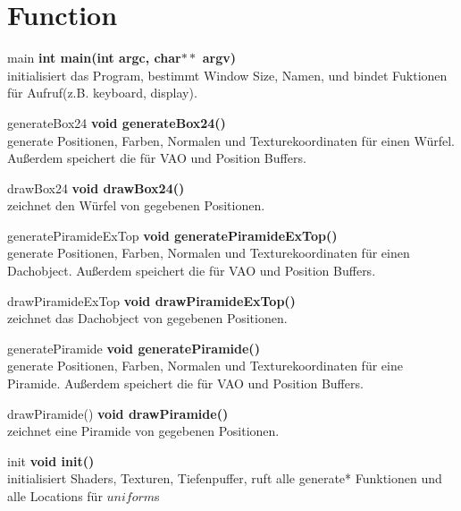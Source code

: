 \documentclass[12pt]{article}
\begin{document}
\pagebreak

\section{Function}
\begin{mybox}[colback=lightgray]{main}
\textbf{int main(int argc, char$**$ argv)} \\
initialisiert das Program, bestimmt Window Size, Namen, und bindet Fuktionen für Aufruf(z.B. keyboard, display).
\end{mybox}

\begin{mybox}[colback=white]{generateBox24}
\textbf{void generateBox24()} \\
generate Positionen, Farben, Normalen und Texturekoordinaten für einen Würfel. 
Außerdem speichert die für VAO und Position Buffers.
\end{mybox}
\begin{mybox}[colback=white]{drawBox24}
\textbf{void drawBox24()} \\
zeichnet den Würfel von gegebenen Positionen.
\end{mybox}

\begin{mybox}[colback=white]{generatePiramideExTop}
\textbf{void generatePiramideExTop()} \\
generate Positionen, Farben, Normalen und Texturekoordinaten für einen Dachobject. 
Außerdem speichert die für VAO und Position Buffers.
\end{mybox}
\begin{mybox}[colback=white]{drawPiramideExTop}
\textbf{void drawPiramideExTop()} \\
zeichnet das Dachobject von gegebenen Positionen.
\end{mybox}

\begin{mybox}[colback=white]{generatePiramide}
\textbf{void generatePiramide()} \\
generate Positionen, Farben, Normalen und Texturekoordinaten für eine Piramide. 
Außerdem speichert die für VAO und Position Buffers.
\end{mybox}
\begin{mybox}[colback=white]{drawPiramide()}
\textbf{void drawPiramide()} \\
zeichnet eine Piramide von gegebenen Positionen.
\end{mybox}

\begin{mybox}[colback=white]{init}
\textbf{void init()} \\
initialisiert Shaders, Texturen, Tiefenpuffer, ruft alle generate* Funktionen und alle Locations für $uniform$s
\end{mybox}
\end{document}
